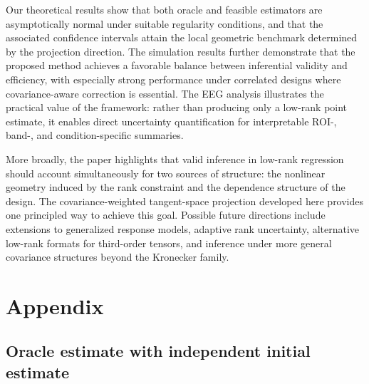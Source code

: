 \documentclass[authoryear,preprint,review,12pt]{elsarticle}
\begin{document}
Our theoretical results show that both oracle and feasible estimators are asymptotically normal under suitable regularity conditions, and that the associated confidence intervals attain the local geometric benchmark determined by the projection direction. The simulation results further demonstrate that the proposed method achieves a favorable balance between inferential validity and efficiency, with especially strong performance under correlated designs where covariance-aware correction is essential. The EEG analysis illustrates the practical value of the framework: rather than producing only a low-rank point estimate, it enables direct uncertainty quantification for interpretable ROI-, band-, and condition-specific summaries.

More broadly, the paper highlights that valid inference in low-rank regression should account simultaneously for two sources of structure: the nonlinear geometry induced by the rank constraint and the dependence structure of the design. The covariance-weighted tangent-space projection developed here provides one principled way to achieve this goal. Possible future directions include extensions to generalized response models, adaptive rank uncertainty, alternative low-rank formats for third-order tensors, and inference under more general covariance structures beyond the Kronecker family.



\section{Appendix}

\subsection{Oracle estimate with independent initial estimate}
\end{document}
